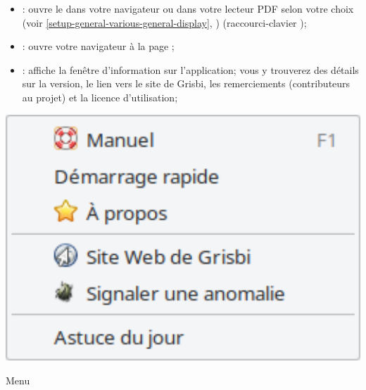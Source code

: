 \vspace{3mm}
\noindent
\begin{minipage}{.7\linewidth}
	\begin{itemize}[rightmargin=.6cm]
		\item {}: ouvre le  %
		dans votre navigateur ou dans votre lecteur \gls{PDF} selon votre choix (voir \vref{setup-general-various-general-display}, ) (raccourci-clavier );
		\item {}: ouvre votre navigateur à la page ;
		\item {}: affiche la fenêtre d'information sur l'application; vous y trouverez des détails sur la version, le lien vers le site de Grisbi, les remerciements (contributeurs au projet) et la licence d'utilisation;
	\end{itemize}
\end{minipage}
\hspace{10pt}	
\begin{minipage}{.3\linewidth}
	\centering						%
	\includegraphics[width=1\textwidth]{image/screenshot/home_menubar_help}
	\vspace{-15pt}					%
	\captionsetup{
		type=figure,%
		name=Fig.,%
		labelsep=newline}			%
	\caption{Menu }	%
	\label{home_menubar_help}
\end{minipage} 

